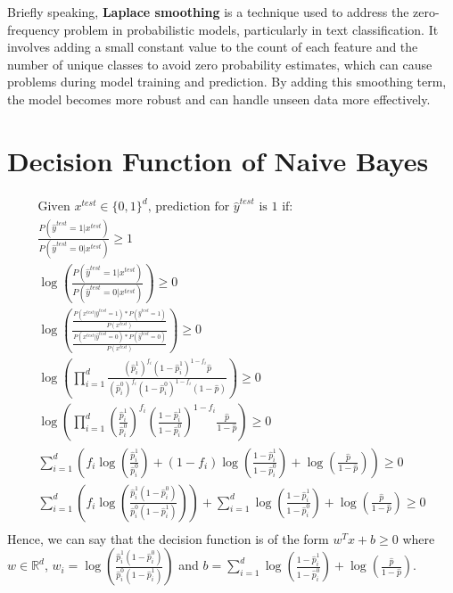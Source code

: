 \documentclass[
]{article}
\begin{document}
Briefly speaking, \textbf{Laplace smoothing} is a technique used to
address the zero-frequency problem in probabilistic models, particularly
in text classification. It involves adding a small constant value to the
count of each feature and the number of unique classes to avoid zero
probability estimates, which can cause problems during model training
and prediction. By adding this smoothing term, the model becomes more
robust and can handle unseen data more effectively.

\hypertarget{decision-function-of-naive-bayes}{%
\section{Decision Function of Naive
Bayes}\label{decision-function-of-naive-bayes}}

\begin{multline*}
\text{Given } x^{test}\in\{0,1\}^d \text{, prediction for }\hat{y}^{test} \text{ is } 1\text{ if:}\\
\frac{P(\hat{y}^{test}=1|x^{test})}{P(\hat{y}^{test}=0|x^{test})}\ge 1\\
\log \left (\frac{P(\hat{y}^{test}=1|x^{test})}{P(\hat{y}^{test}=0|x^{test})}\right )\ge 0\\
\log \left (\frac{\displaystyle\frac{P(x^{test}|\hat{y}^{test}=1)*P(\hat{y}^{test}=1)}{P(x^{test})}}{\displaystyle\frac{P(x^{test}|\hat{y}^{test}=0)*P(\hat{y}^{test}=0)}{P(x^{test})}}\right )\ge 0 \\
\log \left (\prod_{i=1}^d\frac{(\hat{p}^1_i)^{f_i}(1-\hat{p}^1_i)^{1-f_i}\hat{p}}{(\hat{p}^0_i)^{f_i}(1-\hat{p}^0_i)^{1-f_i}(1-\hat{p})}\right )\ge 0 \\
\log \left (\prod_{i=1}^d\left(\frac{\hat{p}^1_i}{\hat{p}^0_i}\right)^{f_i}\left(\frac{1-\hat{p}^1_i}{1-\hat{p}^0_i}\right)^{1-f_i}\frac{\hat{p}}{1-\hat{p}}\right )\ge 0 \\
\sum_{i=1}^d \left (f_i\log\left(\frac{\hat{p}^1_i}{\hat{p}^0_i}\right)+(1-f_i)\log\left(\frac{1-\hat{p}^1_i}{1-\hat{p}^0_i}\right)+\log\left(\frac{\hat{p}}{1-\hat{p}}\right)\right )\ge 0 \\
\sum_{i=1}^d \left (f_i\log\left(\frac{\hat{p}^1_i(1-\hat{p}^0_i)}{\hat{p}^0_i(1-\hat{p}^1_i)}\right)\right )+\sum_{i=1}^d\log\left(\frac{1-\hat{p}^1_i}{1-\hat{p}^0_i}\right)+\log\left(\frac{\hat{p}}{1-\hat{p}}\right)\ge 0 \\
\end{multline*} Hence, we can say that the decision function is of the
form \(w^Tx+b\ge0\) where \(w\in\mathbb{R}^d\),
\(w_i=\displaystyle\log\left(\frac{\hat{p}^1_i(1-\hat{p}^0_i)}{\hat{p}^0_i(1-\hat{p}^1_i)}\right)\)
and
\(b=\displaystyle\sum_{i=1}^d\log\left(\frac{1-\hat{p}^1_i}{1-\hat{p}^0_i}\right)+\log\left(\frac{\hat{p}}{1-\hat{p}}\right)\).
\end{document}
